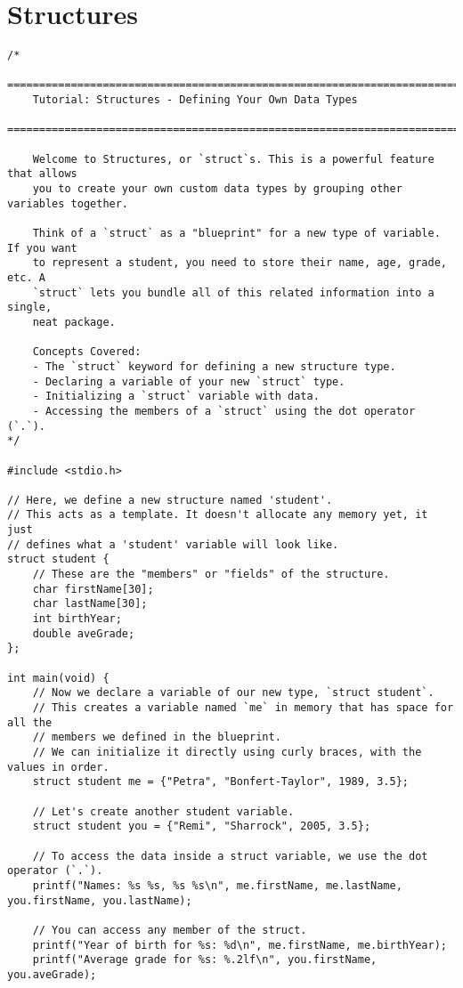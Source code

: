 \documentclass[11pt]{book}
\begin{document}
\chapter{Structures}
\clearpage
\begin{verbatim}
/*
    ================================================================================
    Tutorial: Structures - Defining Your Own Data Types
    ================================================================================

    Welcome to Structures, or `struct`s. This is a powerful feature that allows
    you to create your own custom data types by grouping other variables together.

    Think of a `struct` as a "blueprint" for a new type of variable. If you want
    to represent a student, you need to store their name, age, grade, etc. A
    `struct` lets you bundle all of this related information into a single,
    neat package.

    Concepts Covered:
    - The `struct` keyword for defining a new structure type.
    - Declaring a variable of your new `struct` type.
    - Initializing a `struct` variable with data.
    - Accessing the members of a `struct` using the dot operator (`.`).
*/

#include <stdio.h>

// Here, we define a new structure named 'student'.
// This acts as a template. It doesn't allocate any memory yet, it just
// defines what a 'student' variable will look like.
struct student {
    // These are the "members" or "fields" of the structure.
    char firstName[30];
    char lastName[30];
    int birthYear;
    double aveGrade;
};

int main(void) {
    // Now we declare a variable of our new type, `struct student`.
    // This creates a variable named `me` in memory that has space for all the
    // members we defined in the blueprint.
    // We can initialize it directly using curly braces, with the values in order.
    struct student me = {"Petra", "Bonfert-Taylor", 1989, 3.5};

    // Let's create another student variable.
    struct student you = {"Remi", "Sharrock", 2005, 3.5};

    // To access the data inside a struct variable, we use the dot operator (`.`).
    printf("Names: %s %s, %s %s\n", me.firstName, me.lastName, you.firstName, you.lastName);

    // You can access any member of the struct.
    printf("Year of birth for %s: %d\n", me.firstName, me.birthYear);
    printf("Average grade for %s: %.2lf\n", you.firstName, you.aveGrade);


\end{verbatim}
\end{document}

